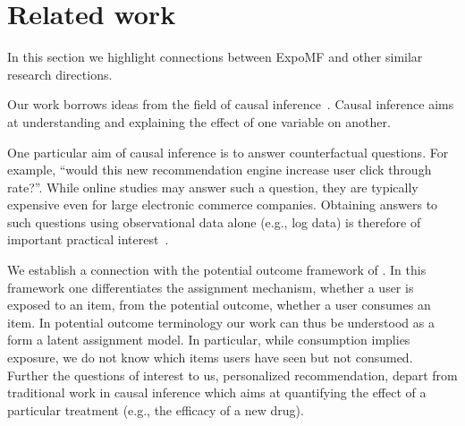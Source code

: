 \section{Related work}
\label{sec:related_work}

In this section we highlight connections between ExpoMF and other
similar research directions. 



 Our work borrows ideas from the field of
causal inference~\cite{pearl2009causality,imbens2015causal}. Causal inference aims at understanding and
explaining the effect of one variable on another. 

One particular aim of causal inference is to answer counterfactual
questions. For example, ``would this new recommendation engine increase
user click through rate?''.  While online studies may answer such a question, they are
typically expensive even for large electronic commerce companies.
Obtaining answers to such questions using observational data alone (e.g.,
log data) is therefore of important practical
interest~\cite{bottou2015counterfactual,li2010contextual,swaminathan2015counterfactual}.

We establish a connection with the potential outcome framework of
\citet{rubin1974ece}. In this framework one differentiates the assignment mechanism,
whether a user is exposed to an item, from the potential outcome, whether a
user consumes an item. In potential outcome terminology our work can thus
be understood as a form a latent assignment model. In particular, while
consumption implies exposure, we do not know which items users have 
seen but not consumed. Further the questions of interest to us,
personalized recommendation, depart from traditional work in causal
inference which aims at quantifying the effect of a particular treatment
(e.g., the efficacy of a new drug). 


